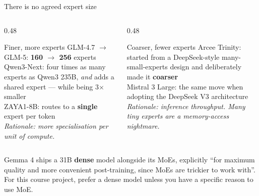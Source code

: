 \documentclass[aspectratio=169,10pt]{beamer}
\begin{document}
\begin{frame}{There is no agreed expert size}
  \begin{columns}[T]
    \begin{column}{0.48\textwidth}
      \begin{block}{Finer, more experts}
        \small
        GLM-4.7 $\to$ GLM-5: \textbf{160 $\to$ 256} experts\\[0.3em]
        Qwen3-Next: four times as many experts as Qwen3 235B, \emph{and} adds a
        shared expert --- while being 3$\times$ smaller\\[0.3em]
        ZAYA1-8B: routes to a \textbf{single} expert per token\\[0.3em]
        \textit{Rationale: more specialisation per unit of compute.}
      \end{block}
    \end{column}
    \begin{column}{0.48\textwidth}
      \begin{block}{Coarser, fewer experts}
        \small
        Arcee Trinity: started from a DeepSeek-style many-small-experts design
        and deliberately made it \textbf{coarser}\\[0.3em]
        Mistral 3 Large: the same move when adopting the DeepSeek V3
        architecture\\[0.3em]
        \textit{Rationale: inference throughput. Many tiny experts are a
        memory-access nightmare.}
      \end{block}
    \end{column}
  \end{columns}
  \vfill
  \begin{gotcha}
    Gemma 4 ships a 31B \textbf{dense} model alongside its MoEs, explicitly
    ``for maximum quality and more convenient post-training, since MoEs are
    trickier to work with''.
    \vspace{0.3em}
    For this course project, prefer a dense model unless you have a specific
    reason to use MoE.
  \end{gotcha}
\end{frame}

\fi

\end{document}
